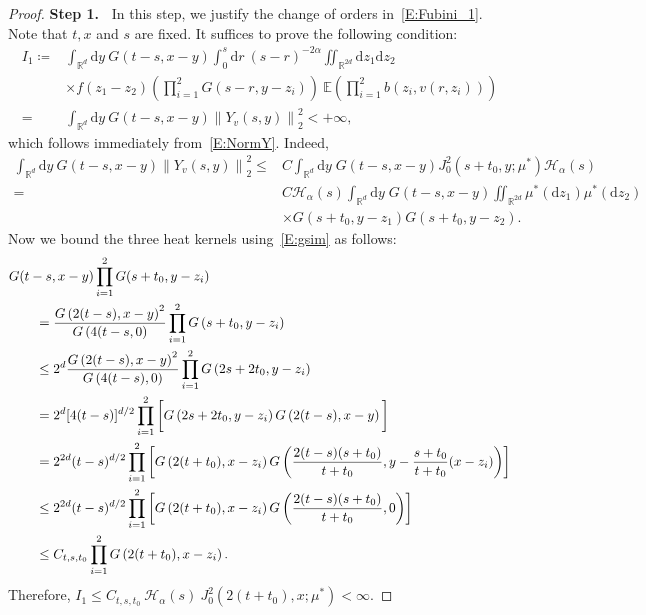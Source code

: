 \documentclass[a4paper,11pt]{article}%
\theoremstyle{plain}
\theoremstyle{definition}
\numberwithin{equation}{section}
\newcommand{\R}{\mathbb{R}}
\newcommand{\E}{\mathbb{E}}
\newcommand{\Norm}[1]{\left\| #1 \right\|}
\newcommand{\ud}{\ensuremath{\mathrm{d}}}
\begin{document}
\begin{proof}
  \textbf{\noindent Step 1.~} In this step, we justify the change of orders in~\eqref{E:Fubini_1}.
  Note that $t, x$ and $s$ are fixed. It suffices to prove the following condition:
  \begin{align*}
    I_1\coloneqq & \int_{\R^d}\ud y \: G(t-s,x-y) \int_0^s \ud r\: (s-r)^{-2\alpha} \iint_{\R^{2d}} \ud z_1\ud z_2\:                \\
                 & \times f(z_1-z_2) \left(\prod_{i = 1}^{2} G(s-r,y-z_i)\right) \: \E\left(\prod_{i = 1}^{2}b(z_i,v(r,z_i))\right) \\
       =         & \int_{\R^d}\ud y \: G(t-s,x-y) \Norm{Y_v(s,y)}_2^2 < +\infty,
  \end{align*}
  which follows immediately from~\eqref{E:NormY}. Indeed,
  \begin{align*}
    \int_{\R^d}\ud y \: G(t-s,x-y) \Norm{Y_v(s,y)}_2^2
    \le & C \int_{\R^d} \ud y \; G(t-s,x-y) J_0^2 (s+t_0,y;\mu^*) \mathcal{H}_\alpha(s)                        \\
     =  & C \mathcal{H}_\alpha(s) \int_{\R^d} \ud y \; G(t-s,x-y)\iint_{\R^{2d}}\mu^* (\ud z_1)\mu^* (\ud z_2) \\
        & \times G\left(s+t_0,y-z_1\right)G\left(s+t_0,y-z_2\right).
  \end{align*}
  Now we bound the three heat kernels using~\eqref{E:gsim} as follows:
  \begin{align*}
     \MoveEqLeft G (t-s,x-y) \prod_{i = 1}^{2}G(s+t_0,y- z_i)\\
       & = \frac{G\left(2(t-s),x-y\right)^2}{G\left(4(t-s,0\right)} \prod_{i = 1}^{2}G\left(s+t_0,y- z_i\right)                                                  \\
       & \le 2^d \frac{G\left(2(t-s),x-y\right)^2}{G\left(4(t-s),0\right)} \prod_{i = 1}^{2}G\left(2s+2t_0,y- z_i\right)                                         \\
       & = 2^d [4(t-s)]^{d/2} \prod_{i = 1}^{2}\bigg[ G\left(2s+2t_0,y- z_i\right)G\left(2(t-s),x-y\right)\bigg]                                                 \\
       & = 2^{2d} (t-s)^{d/2} \prod_{i = 1}^{2}\left[G\left(2(t+t_0),x- z_i\right)G\left(\frac{2(t-s)(s+t_0)}{t+t_0},y-\frac{s+t_0}{t+t_0}(x- z_i)\right)\right] \\
       & \le 2^{2d} (t-s)^{d/2} \prod_{i = 1}^{2}\left[G\left(2(t+t_0),x- z_i\right)G\left(\frac{2(t-s)(s+t_0)}{t+t_0},0\right)\right]                           \\
       & \le C_{t,s,t_0} \prod_{i = 1}^{2} G\left(2(t+t_0),x- z_i\right).
  \end{align*}
  Therefore, $I_1\le C_{t,s,t_0} \: \mathcal{H}_{\alpha}(s) \: J_0^2\left(2(t+t_0),x;\mu^*\right)
  <\infty$. \bigskip


\end{proof}
\end{document}
